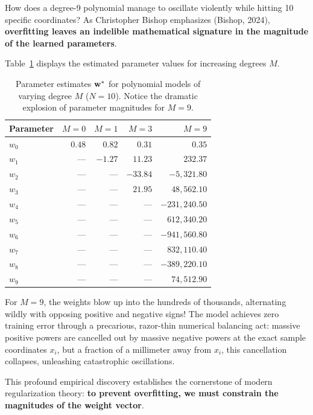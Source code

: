 \begin{examinsight}
How does a degree-9 polynomial manage to oscillate violently while hitting 10 specific coordinates? As Christopher Bishop emphasizes (Bishop, 2024), \textbf{overfitting leaves an indelible mathematical signature in the magnitude of the learned parameters}. 

Table~\ref{tab:polynomial_weights_explosion} displays the estimated parameter values for increasing degrees $M$.
\begin{table}[H]
\centering
\small
\renewcommand{\arraystretch}{0.95}
\caption{Parameter estimates $\mathbf{w}^*$ for polynomial models of varying degree $M$ ($N = 10$). Notice the dramatic explosion of parameter magnitudes for $M=9$.}
\label{tab:polynomial_weights_explosion}
\begin{tabular}{lrrrr}
\toprule
\textbf{Parameter} & \textbf{$M = 0$} & \textbf{$M = 1$} & \textbf{$M = 3$} & \textbf{$M = 9$} \\
\midrule
$w_0$ & $0.48$ & $0.82$ & $0.31$ & $0.35$ \\
$w_1$ & --- & $-1.27$ & $11.23$ & $232.37$ \\
$w_2$ & --- & --- & $-33.84$ & $-5{,}321.80$ \\
$w_3$ & --- & --- & $21.95$ & $48{,}562.10$ \\
$w_4$ & --- & --- & --- & $-231{,}240.50$ \\
$w_5$ & --- & --- & --- & $612{,}340.20$ \\
$w_6$ & --- & --- & --- & $-941{,}560.80$ \\
$w_7$ & --- & --- & --- & $832{,}110.40$ \\
$w_8$ & --- & --- & --- & $-389{,}220.10$ \\
$w_9$ & --- & --- & --- & $74{,}512.90$ \\
\bottomrule
\end{tabular}
\end{table}
For $M=9$, the weights blow up into the hundreds of thousands, alternating wildly with opposing positive and negative signs! The model achieves zero training error through a precarious, razor-thin numerical balancing act: massive positive powers are cancelled out by massive negative powers at the exact sample coordinates $x_i$, but a fraction of a millimeter away from $x_i$, this cancellation collapses, unleashing catastrophic oscillations. 

This profound empirical discovery establishes the cornerstone of modern regularization theory: \textbf{to prevent overfitting, we must constrain the magnitudes of the weight vector}.
\end{examinsight}

